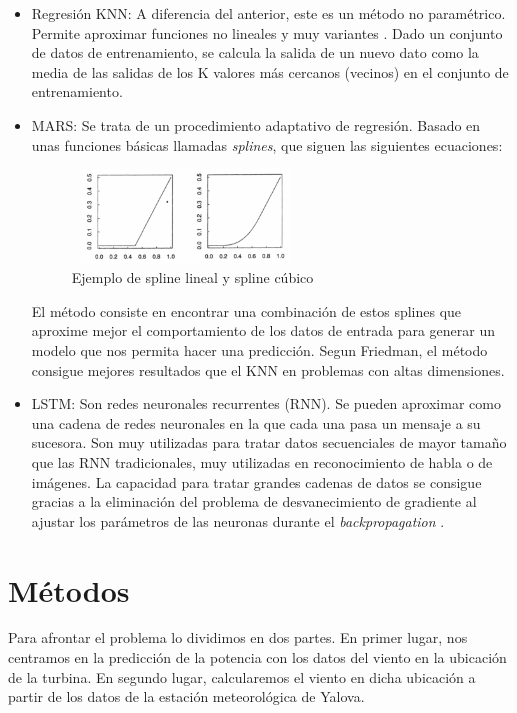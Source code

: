 \documentclass[journal]{IEEEtran}
\begin{document}
\begin{itemize}
    \item Regresión KNN: A diferencia del anterior, este es un método no paramétrico. Permite aproximar funciones no lineales y muy variantes \cite{James2013}. Dado un conjunto de datos de entrenamiento, se calcula la salida de un nuevo dato como la media de las salidas de los K valores más cercanos (vecinos) en el conjunto de entrenamiento.
    \item MARS: Se trata de un procedimiento adaptativo de regresión. Basado en unas funciones básicas llamadas \emph{splines}, que siguen las siguientes ecuaciones: 
    \begin{figure}[!ht]
        \centering
        \includegraphics[width=6cm, height=2.5cm]{Splines.png}
        \captionsetup{justification=centering,singlelinecheck=false}
        \caption{Ejemplo de spline lineal y spline cúbico}
        \label{fig:splines}
    \end{figure}
    El método consiste en encontrar una combinación de estos splines que aproxime mejor el comportamiento de los datos de entrada para generar un modelo que nos permita hacer una predicción. Segun Friedman, \cite{JHFRIEDMAN1991} el método consigue mejores resultados que el KNN en problemas con altas dimensiones.
    \item LSTM: Son redes neuronales recurrentes (RNN). Se pueden aproximar como una cadena de redes neuronales en la que cada una pasa un mensaje a su sucesora. Son muy utilizadas para tratar datos secuenciales de mayor tamaño que las RNN tradicionales, muy utilizadas en reconocimiento de habla o de imágenes. La capacidad para tratar grandes cadenas de datos se consigue gracias a la eliminación del problema de desvanecimiento de gradiente al ajustar los parámetros de las neuronas durante el \emph{backpropagation} \cite{45500}.

\end{itemize}


\section{Métodos}
Para afrontar el problema lo dividimos en dos partes. En primer lugar, nos centramos en la predicción de la potencia con los datos del viento en la ubicación de la turbina. En segundo lugar, calcularemos el viento en dicha ubicación a partir de los datos de la estación meteorológica de Yalova. 
\end{document}
